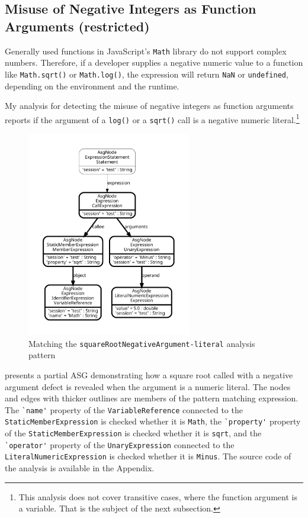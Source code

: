 \subsection{Misuse of Negative Integers as Function Arguments (restricted)}

Generally used functions in JavaScript's \lstinline{Math} library do not support complex numbers. Therefore, if a developer supplies a negative numeric value to a function like \lstinline{Math.sqrt()} or \lstinline{Math.log()}, the expression will return \lstinline{NaN} or \lstinline{undefined}, depending on the environment and the runtime.

My analysis for detecting the misuse of negative integers as function arguments reports if the argument of a \lstinline{log()} or a \lstinline{sqrt()} call is a negative numeric literal.\footnote{This analysis does not cover transitive cases, where the function argument is a variable. That is the subject of the next subsection.}

\begin{figure}[!htb]
	\centering
	\includegraphics[height=90mm, trim=12mm 12mm 12mm 12mm,clip]{figures/analysis_squareRootArgument.pdf}
	\caption{Matching the \lstinline{squareRootNegativeArgument-literal} analysis pattern}
	\label{fig:analysis-squarerootnegativeargument-simple}
\end{figure}

 presents a partial ASG demonstrating how a square root called with a negative argument defect is revealed when the argument is a numeric literal. The nodes and edges with thicker outlines are members of the pattern matching expression. The \lstinline{`name'} property of the \lstinline{VariableReference} connected to the \lstinline{StaticMemberExpression} is checked whether it is \lstinline{Math}, the \lstinline{`property'} property of the \lstinline{StaticMemberExpression} is checked whether it is \lstinline{sqrt}, and the \lstinline[keywordstyle={}]{`operator'} property of the \lstinline{UnaryExpression} connected to the \lstinline{LiteralNumericExpression} is checked whether it is \lstinline{Minus}. The source code of the analysis is available in the Appendix.


